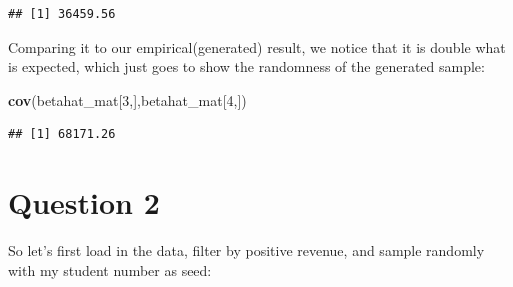 \documentclass[
]{article}
\newenvironment{Shaded}{\begin{snugshade}}{\end{snugshade}}
\newcommand{\DecValTok}[1]{\textcolor[rgb]{0.00,0.00,0.81}{#1}}
\newcommand{\FunctionTok}[1]{\textcolor[rgb]{0.13,0.29,0.53}{\textbf{#1}}}
\newcommand{\NormalTok}[1]{#1}
\newcommand{\OtherTok}[1]{\textcolor[rgb]{0.56,0.35,0.01}{#1}}
\newcommand{\SpecialCharTok}[1]{\textcolor[rgb]{0.81,0.36,0.00}{\textbf{#1}}}
\newcommand{\StringTok}[1]{\textcolor[rgb]{0.31,0.60,0.02}{#1}}
\begin{document}
\begin{verbatim}
## [1] 36459.56
\end{verbatim}

Comparing it to our empirical(generated) result, we notice that it is
double what is expected, which just goes to show the randomness of the
generated sample:

\begin{Shaded}
\begin{Highlighting}[]
\FunctionTok{cov}\NormalTok{(betahat\_mat[}\DecValTok{3}\NormalTok{,],betahat\_mat[}\DecValTok{4}\NormalTok{,])}
\end{Highlighting}
\end{Shaded}

\begin{verbatim}
## [1] 68171.26
\end{verbatim}

\section{Question 2}\label{question-2}

So let's first load in the data, filter by positive revenue, and sample
randomly with my student number as seed:

\begin{Shaded}
\end{Shaded}
\end{document}
